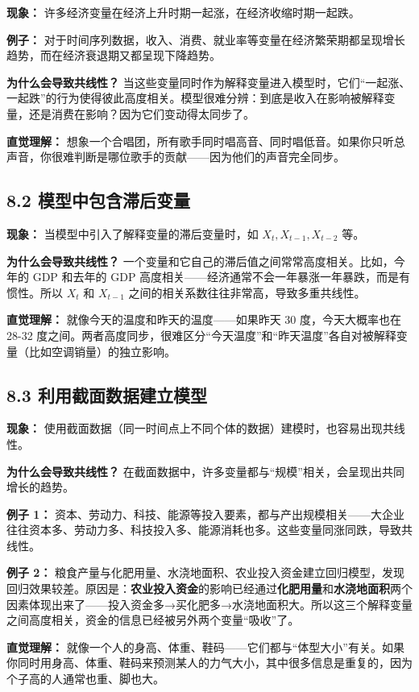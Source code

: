 \documentclass[12pt,a4paper]{ctexart}
\begin{document}
\textbf{现象：} 许多经济变量在经济上升时期一起涨，在经济收缩时期一起跌。

\textbf{例子：} 对于时间序列数据，收入、消费、就业率等变量在经济繁荣期都呈现增长趋势，而在经济衰退期又都呈现下降趋势。

\textbf{为什么会导致共线性？} 当这些变量同时作为解释变量进入模型时，它们“一起涨、一起跌”的行为使得彼此高度相关。模型很难分辨：到底是收入在影响被解释变量，还是消费在影响？因为它们变动得太同步了。

\textbf{直觉理解：} 想象一个合唱团，所有歌手同时唱高音、同时唱低音。如果你只听总声音，你很难判断是哪位歌手的贡献——因为他们的声音完全同步。

\subsection*{8.2 模型中包含滞后变量}

\textbf{现象：} 当模型中引入了解释变量的滞后变量时，如 $X_t, X_{t-1}, X_{t-2}$ 等。

\textbf{为什么会导致共线性？} 一个变量和它自己的滞后值之间常常高度相关。比如，今年的 GDP 和去年的 GDP 高度相关——经济通常不会一年暴涨一年暴跌，而是有惯性。所以 $X_t$ 和 $X_{t-1}$ 之间的相关系数往往非常高，导致多重共线性。

\textbf{直觉理解：} 就像今天的温度和昨天的温度——如果昨天 30 度，今天大概率也在 28-32 度之间。两者高度同步，很难区分“今天温度”和“昨天温度”各自对被解释变量（比如空调销量）的独立影响。

\subsection*{8.3 利用截面数据建立模型}

\textbf{现象：} 使用截面数据（同一时间点上不同个体的数据）建模时，也容易出现共线性。

\textbf{为什么会导致共线性？} 在截面数据中，许多变量都与“规模”相关，会呈现出共同增长的趋势。

\textbf{例子 1：} 资本、劳动力、科技、能源等投入要素，都与产出规模相关——大企业往往资本多、劳动力多、科技投入多、能源消耗也多。这些变量同涨同跌，导致共线性。

\textbf{例子 2：} 粮食产量与化肥用量、水浇地面积、农业投入资金建立回归模型，发现回归效果较差。原因是：\textbf{农业投入资金}的影响已经通过\textbf{化肥用量}和\textbf{水浇地面积}两个因素体现出来了——投入资金多→买化肥多→水浇地面积大。所以这三个解释变量之间高度相关，资金的信息已经被另外两个变量“吸收”了。

\textbf{直觉理解：} 就像一个人的身高、体重、鞋码——它们都与“体型大小”有关。如果你同时用身高、体重、鞋码来预测某人的力气大小，其中很多信息是重复的，因为个子高的人通常也重、脚也大。
\end{document}
